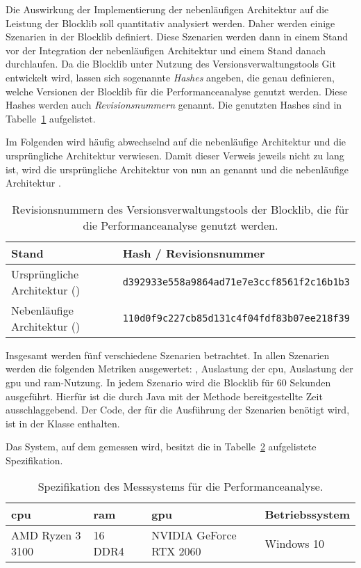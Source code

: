 Die Auswirkung der Implementierung der nebenläufigen Architektur auf die Leistung der Blocklib soll quantitativ analysiert werden. Daher werden einige Szenarien in der Blocklib definiert. Diese Szenarien werden dann in einem Stand vor der Integration der nebenläufigen Architektur und einem Stand danach durchlaufen. Da die Blocklib unter Nutzung des Versionsverwaltungstools Git~\cite{Chacon2014} entwickelt wird, lassen sich sogenannte \emph{Hashes} angeben, die genau definieren, welche Versionen der Blocklib für die Performanceanalyse genutzt werden. Diese Hashes werden auch \emph{Revisionsnummern} genannt. Die genutzten Hashes sind in Tabelle~\ref{tab:perfHash} aufgelistet.

Im Folgenden wird häufig abwechselnd auf die nebenläufige Architektur und die ursprüngliche Architektur verwiesen. Damit dieser Verweis jeweils nicht zu lang ist, wird die ursprüngliche Architektur von nun an \emph{\sysA{}} genannt und die nebenläufige Architektur \emph{\sysB{}}.

\begin{table}[!htbp]
	\centering
	\begin{tabular}{ll}
		\toprule
		Stand & Hash / Revisionsnummer \\
		\midrule
		Ursprüngliche Architektur (\sysA{}) & \texttt{d392933e558a9864ad71e7e3ccf8561f2c16b1b3} \\
		Nebenläufige Architektur (\sysB{})& \texttt{110d0f9c227cb85d131c4f04fdf83b07ee218f39}\\
		\bottomrule
	\end{tabular}
	\caption{Revisionsnummern des Versionsverwaltungstools der Blocklib, die für die Performanceanalyse genutzt werden.}\label{tab:perfHash}
\end{table}

Insgesamt werden fünf verschiedene Szenarien betrachtet. In allen Szenarien werden die folgenden Metriken ausgewertet: \si{\fps}, Auslastung der \acs{cpu}, Auslastung der \ac{gpu} und \ac{ram}-Nutzung. In jedem Szenario wird die Blocklib für 60 Sekunden ausgeführt. Hierfür ist die durch Java mit der Methode  bereitgestellte Zeit ausschlaggebend. Der Code, der für die Ausführung der Szenarien benötigt wird, ist in der Klasse \classThreadingProgram{} enthalten.

Das System, auf dem gemessen wird, besitzt die in Tabelle~\ref{tab:spec} aufgelistete Spezifikation.

\begin{table}[!h]
	\centering
	\begin{tabular}[]{llll}
		\ac{cpu} & \ac{ram} & \ac{gpu} & Betriebssystem\\
		\midrule
		AMD Ryzen 3 3100 & \SI{16}{\giga\byte} DDR4 & NVIDIA GeForce RTX 2060 & Windows 10
	\end{tabular}
	\caption{Spezifikation des Messsystems für die Performanceanalyse.}\label{tab:spec}
\end{table}

